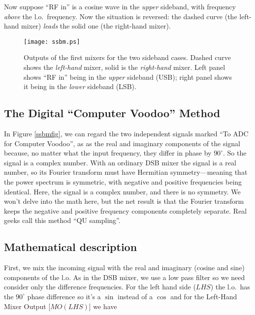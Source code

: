 \documentclass[11pt,preprint]{aastex}
\begin{document}
Now suppose ``RF in'' is a cosine wave in the {\it upper} sideband, with
frequency {\it above} the l.o.\ frequency. Now the situation is
reversed: the dashed curve (the left-hand mixer) {\it leads} the solid
one (the right-hand mixer).


\begin{figure}[h]
\hspace{-0.5in}
        \texttt{[image: ssbm.ps]}
\caption{Outputs of the first mixers for the two sideband cases. Dashed
  curve shows the {\it left-hand} mixer, solid is the {\it right-hand}
  mixer. Left panel shows ``RF in'' being in the {\it upper} sideband
  (USB); right panel shows it being in the {\it lower} sideband (LSB).
\label{mixerout}}
\end{figure}

\subsection{The Digital ``Computer Voodoo'' Method}

In Figure \ref{ssbmfig}, we can regard the two independent signals
marked ``To ADC for Computer Voodoo'', as as the real and imaginary
components of the signal because, no matter what the input frequency,
they differ in phase by $90^\circ$. So the signal is a complex
number. With an ordinary DSB mixer the signal is a real number, so its
Fourier transform must have Hermitian symmetry---meaning that the power
spectrum is symmetric, with negative and positive frequencies being
identical. Here, the signal is a complex number, and there is no
symmetry. We won't delve into the math here, but the net result is that
the Fourier transform keeps the negative and positive frequency
components completely separate. Real geeks call this method ``QU
sampling''.

\subsection{Mathematical description} \label{mathdescr}

First, we mix the incoming signal with the real and imaginary (cosine
and sine) components of the l.o. As in the DSB mixer, we use a low pass
filter so we need consider only the difference frequencies. For the left
hand side ($LHS$) the l.o.\ has the $90^\circ$ phase difference so it's
a $\sin$ instead of a $\cos$ and for the Left-Hand Mixer Output
[$MO(LHS)$] we have
\end{document}
